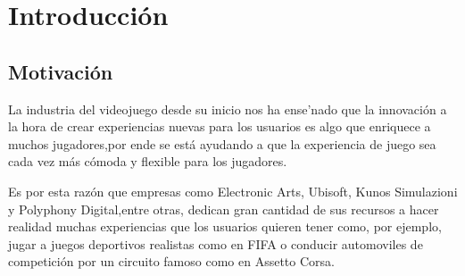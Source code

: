%
%
%
%
%
%
%
%
%
%

\chapter{Introducci\'on}

\section{Motivaci\'on}
\label{cap1:sec:introduccion}

La industria del videojuego desde su inicio nos ha ense'nado que la innovaci\'on
 a la hora de crear experiencias nuevas para los usuarios es algo que enriquece a muchos jugadores,por ende se est\'a ayudando a que
la experiencia de juego sea cada vez m\'as c\'omoda y flexible para los jugadores.

Es por esta raz\'on que empresas como Electronic Arts, Ubisoft, Kunos Simulazioni y Polyphony Digital,entre otras, dedican gran cantidad de sus recursos
a hacer realidad muchas experiencias que los usuarios quieren tener como, por ejemplo,
 jugar a juegos deportivos realistas como en FIFA o conducir automoviles de competici\'on por un circuito famoso como en Assetto Corsa.

